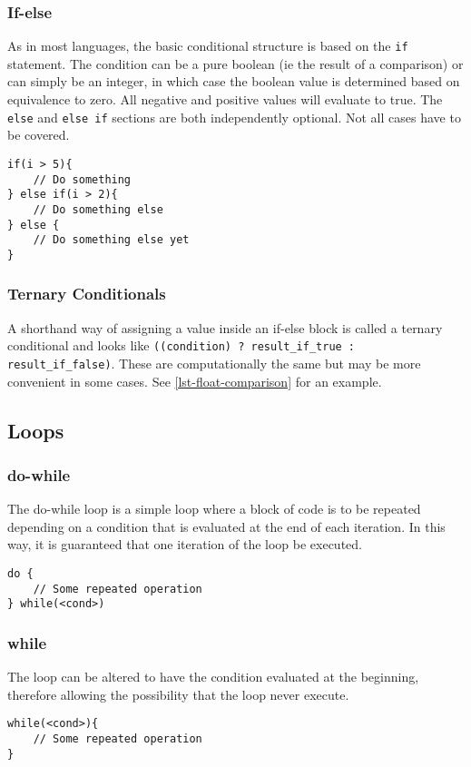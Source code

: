 \documentclass[10pt]{article}
\begin{document}
\subsubsection{If-else}\label{sec:if-else}
As in most languages, the basic conditional structure is based on the \texttt{if} statement. The condition can be a pure boolean (ie the result of a comparison) or can simply be an integer, in which case the boolean value is determined based on equivalence to zero. All negative and positive values will evaluate to true. The \texttt{else} and \texttt{else if} sections are both independently optional. Not all cases have to be covered.
\begin{lstlisting}[label=lst-if-else,caption=If-else structure]
if(i > 5){
	// Do something
} else if(i > 2){
	// Do something else
} else {
	// Do something else yet
}
\end{lstlisting}

\subsubsection{Ternary Conditionals} \label{sec:ternary-conditionals}
A shorthand way of assigning a value inside an if-else block is called a ternary conditional and looks like \texttt{((condition) ? result\_if\_true : result\_if\_false)}. These are computationally the same but may be more convenient in some cases. See \autoref{lst-float-comparison} for an example.

\subsection{Loops}

\subsubsection*{do-while}
The do-while loop is a simple loop where a block of code is to be repeated depending on a condition that is evaluated at the end of each iteration. In this way, it is guaranteed that one iteration of the loop be executed.
\begin{lstlisting}[label=lst-do-while,caption=Do-while loop]
do {
	// Some repeated operation
} while(<cond>)
\end{lstlisting}

\subsubsection*{while}
The loop can be altered to have the condition evaluated at the beginning, therefore allowing the possibility that the loop never execute.
\begin{lstlisting}[label=lst-while-loop,caption=While loop]
while(<cond>){
	// Some repeated operation
}
\end{lstlisting}
\end{document}
